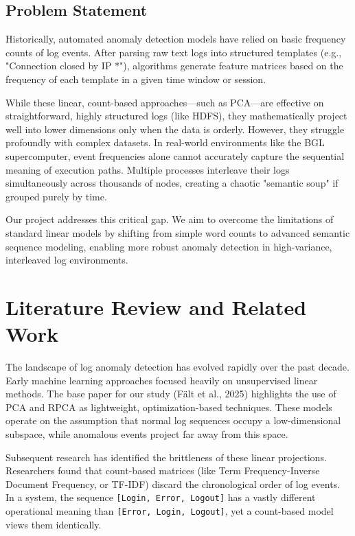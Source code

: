 \documentclass[12pt]{article}
\begin{document}
\subsection{Problem Statement}
Historically, automated anomaly detection models have relied on basic frequency counts of log events. After parsing raw text logs into structured templates (e.g., "Connection closed by IP {*}"), algorithms generate feature matrices based on the frequency of each template in a given time window or session. 

While these linear, count-based approaches---such as PCA---are effective on straightforward, highly structured logs (like HDFS), they mathematically project well into lower dimensions only when the data is orderly. However, they struggle profoundly with complex datasets. In real-world environments like the BGL supercomputer, event frequencies alone cannot accurately capture the sequential meaning of execution paths. Multiple processes interleave their logs simultaneously across thousands of nodes, creating a chaotic "semantic soup" if grouped purely by time. 

Our project addresses this critical gap. We aim to overcome the limitations of standard linear models by shifting from simple word counts to advanced semantic sequence modeling, enabling more robust anomaly detection in high-variance, interleaved log environments.

\section{Literature Review and Related Work}
The landscape of log anomaly detection has evolved rapidly over the past decade. Early machine learning approaches focused heavily on unsupervised linear methods. The base paper for our study (Fält et al., 2025) highlights the use of PCA and RPCA as lightweight, optimization-based techniques. These models operate on the assumption that normal log sequences occupy a low-dimensional subspace, while anomalous events project far away from this space.

Subsequent research has identified the brittleness of these linear projections. Researchers found that count-based matrices (like Term Frequency-Inverse Document Frequency, or TF-IDF) discard the chronological order of log events. In a system, the sequence \texttt{[Login, Error, Logout]} has a vastly different operational meaning than \texttt{[Error, Login, Logout]}, yet a count-based model views them identically.
\end{document}

